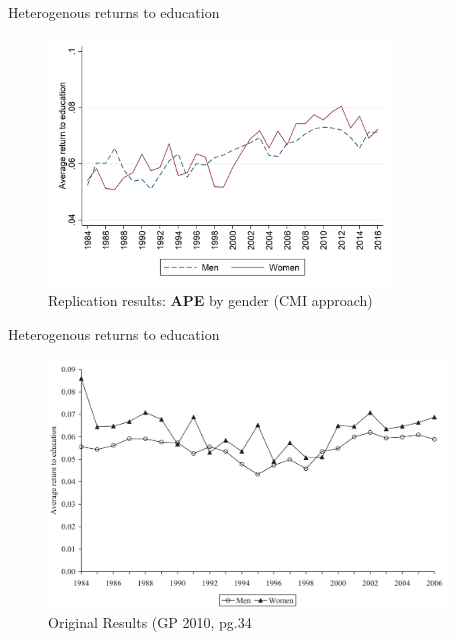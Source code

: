 \documentclass[10pt,ignorenonframetext,]{beamer}
\begin{document}
\begin{frame}{Heterogenous returns to education}
\protect\hypertarget{heterogenous-returns-to-education}{}

\begin{figure}
\centering
\includegraphics[width=\textwidth,height=2.60417in]{img/results_sex.png}
\caption{Replication results: \textbf{APE} by gender (CMI approach)}
\end{figure}

\end{frame}

\begin{frame}{Heterogenous returns to education}
\protect\hypertarget{heterogenous-returns-to-education-1}{}

\begin{figure}
\centering
\includegraphics[width=\textwidth,height=2.60417in]{img/GP2010_CMI_gender.png}
\caption{Original Results (GP 2010, pg.34}
\end{figure}

\end{frame}
\end{document}
